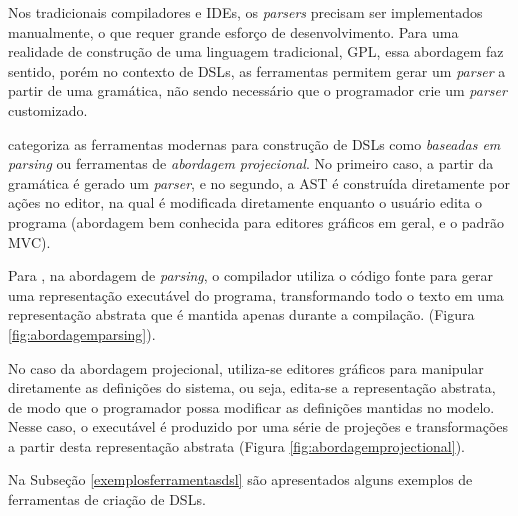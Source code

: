 Nos tradicionais compiladores e \gls{IDE}s, os \textit{parsers} precisam ser implementados manualmente, o que requer grande esforço de desenvolvimento. Para uma realidade de construção de uma linguagem tradicional, \gls{GPL}, essa abordagem faz sentido, porém no contexto de \gls{DSL}s, as ferramentas permitem gerar um \textit{parser} a partir de uma gramática, não sendo necessário que o programador crie um \textit{parser} customizado.

 categoriza as ferramentas modernas para construção de \gls{DSL}s como \textit{baseadas em parsing} ou ferramentas de \textit{abordagem projecional}. No primeiro caso, a partir da gramática é gerado um \textit{parser}, e no segundo, a \gls{AST} é construída diretamente por ações no editor, na qual é modificada diretamente enquanto o usuário edita o programa (abordagem bem conhecida para editores gráficos em geral, e o padrão \gls{MVC}). 

Para , na abordagem de \textit{parsing}, o compilador utiliza o código fonte para gerar uma representação executável do programa, transformando todo o texto em uma representação abstrata que é mantida apenas durante a compilação. (Figura \ref{fig:abordagemparsing}). 



\newpage
No caso da abordagem projecional, utiliza-se editores gráficos para manipular diretamente as definições do sistema, ou seja, edita-se a representação abstrata, de modo que o programador possa modificar as definições mantidas no modelo. Nesse caso, o executável é produzido por uma série de projeções e transformações a partir desta representação abstrata (Figura \ref{fig:abordagemprojectional}).




Na Subseção \ref{exemplosferramentasdsl} são apresentados alguns exemplos de ferramentas de criação de \gls{DSL}s.

